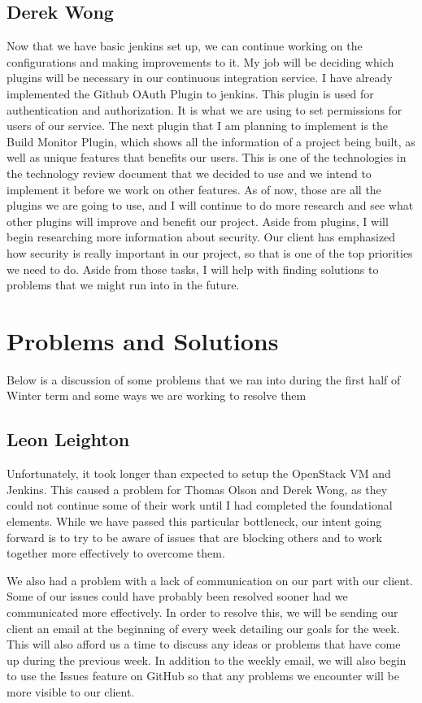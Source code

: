 \documentclass[10pt,onecolumn,journal,draftclsnofoot]{IEEEtran}
\begin{document}
\subsection{Derek Wong}
Now that we have basic jenkins set up, we can continue working on the configurations and making improvements to it. My job will be deciding which plugins will be necessary in our continuous integration service. I have already implemented the Github OAuth Plugin to jenkins. This plugin is used for authentication and authorization. It is what we are using to set permissions for users of our service. The next plugin that I am planning to implement is the Build Monitor Plugin, which shows all the information of a project being built, as well as unique features that benefits our users. This is one of the technologies in the technology review document that we decided to use and we intend to implement it before we work on other features. As of now, those are all the plugins we are going to use, and I will continue to do more research and see what other plugins will improve and benefit our project. Aside from plugins, I will begin researching more information about security. Our client has emphasized how security is really important in our project, so that is one of the top priorities we need to do. Aside from those tasks, I will help with finding solutions to problems that we might run into in the future.


\section{Problems and Solutions}
Below is a discussion of some problems that we ran into during the first half of Winter term and some ways we are working to resolve them
\subsection{Leon Leighton}
Unfortunately, it took longer than expected to setup the OpenStack VM and Jenkins.
This caused a problem for Thomas Olson and Derek Wong, as they could not continue some of their work until I had completed the foundational elements.
While we have passed this particular bottleneck, our intent going forward is to try to be aware of issues that are blocking others and to work together more effectively to overcome them.

We also had a problem with a lack of communication on our part with our client. Some of our issues could have probably been resolved sooner had we communicated more effectively. 
In order to resolve this, we will be sending our client an email at the beginning of every week detailing our goals for the week.
This will also afford us a time to discuss any ideas or problems that have come up during the previous week. 
In addition to the weekly email, we will also begin to use the Issues feature on GitHub so that any problems we encounter will be more visible to our client. 
\end{document}
